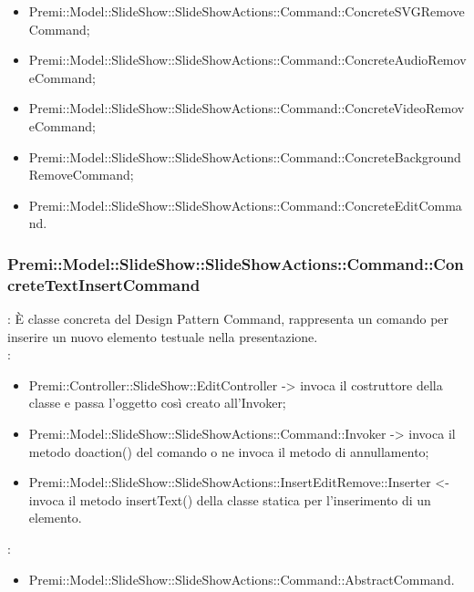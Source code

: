{{\begin{itemize}
                    \item Premi::Model::SlideShow::SlideShowActions::Command::ConcreteSVGRemoveCommand;
                    \item Premi::Model::SlideShow::SlideShowActions::Command::ConcreteAudioRemoveCommand;
                    \item Premi::Model::SlideShow::SlideShowActions::Command::ConcreteVideoRemoveCommand;
                    \item Premi::Model::SlideShow::SlideShowActions::Command::ConcreteBackgroundRemoveCommand;
                    \item Premi::Model::SlideShow::SlideShowActions::Command::ConcreteEditCommand.
                    \end{itemize}
                    }
    \subsubsection{Premi::Model::SlideShow::SlideShowActions::Command::ConcreteTextInsertCommand}{
				\textbf{\tipo}: È classe concreta del Design Pattern Command, rappresenta un comando per inserire un nuovo elemento testuale nella presentazione.\\	
				\textbf{\relaz}: 
				\begin{itemize}
					\item Premi::Controller::SlideShow::EditController -> invoca il costruttore della classe e passa l’oggetto così creato all’Invoker;
					\item Premi::Model::SlideShow::SlideShowActions::Command::Invoker -> invoca il metodo doaction() del comando o ne invoca il metodo di annullamento;
                    \item Premi::Model::SlideShow::SlideShowActions::InsertEditRemove::Inserter <- invoca il metodo insertText() della classe statica per l’inserimento di un elemento.
				\end{itemize}	
                \textbf{\base}: 
                    \begin{itemize}
                    \item Premi::Model::SlideShow::SlideShowActions::Command::AbstractCommand.
                    \end{itemize}
                    }
}
